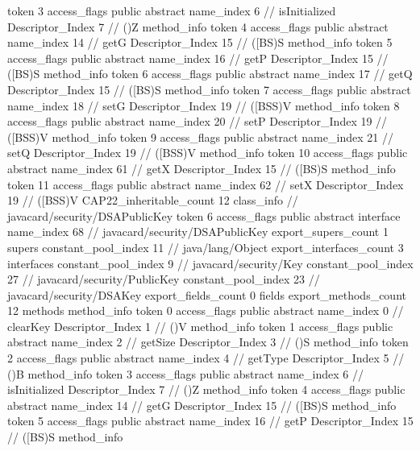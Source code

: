 {{{{{					token	3
					access_flags	public abstract
					name_index	6		// isInitialized
					Descriptor_Index	7		// ()Z
				}
				method_info {
					token	4
					access_flags	public abstract
					name_index	14		// getG
					Descriptor_Index	15		// ([BS)S
				}
				method_info {
					token	5
					access_flags	public abstract
					name_index	16		// getP
					Descriptor_Index	15		// ([BS)S
				}
				method_info {
					token	6
					access_flags	public abstract
					name_index	17		// getQ
					Descriptor_Index	15		// ([BS)S
				}
				method_info {
					token	7
					access_flags	public abstract
					name_index	18		// setG
					Descriptor_Index	19		// ([BSS)V
				}
				method_info {
					token	8
					access_flags	public abstract
					name_index	20		// setP
					Descriptor_Index	19		// ([BSS)V
				}
				method_info {
					token	9
					access_flags	public abstract
					name_index	21		// setQ
					Descriptor_Index	19		// ([BSS)V
				}
				method_info {
					token	10
					access_flags	public abstract
					name_index	61		// getX
					Descriptor_Index	15		// ([BS)S
				}
				method_info {
					token	11
					access_flags	public abstract
					name_index	62		// setX
					Descriptor_Index	19		// ([BSS)V
				}
			}
			CAP22_inheritable_count	12
		}
		class_info {		// javacard/security/DSAPublicKey
			token	6
			access_flags	public abstract interface
			name_index	68		// javacard/security/DSAPublicKey
			export_supers_count	1
			supers {
				constant_pool_index	11		// java/lang/Object
			}
			export_interfaces_count	3
			interfaces {
				constant_pool_index	9		// javacard/security/Key
				constant_pool_index	27		// javacard/security/PublicKey
				constant_pool_index	23		// javacard/security/DSAKey
			}
			export_fields_count	0
			fields {
			}
			export_methods_count	12
			methods {
				method_info {
					token	0
					access_flags	public abstract
					name_index	0		// clearKey
					Descriptor_Index	1		// ()V
				}
				method_info {
					token	1
					access_flags	public abstract
					name_index	2		// getSize
					Descriptor_Index	3		// ()S
				}
				method_info {
					token	2
					access_flags	public abstract
					name_index	4		// getType
					Descriptor_Index	5		// ()B
				}
				method_info {
					token	3
					access_flags	public abstract
					name_index	6		// isInitialized
					Descriptor_Index	7		// ()Z
				}
				method_info {
					token	4
					access_flags	public abstract
					name_index	14		// getG
					Descriptor_Index	15		// ([BS)S
				}
				method_info {
					token	5
					access_flags	public abstract
					name_index	16		// getP
					Descriptor_Index	15		// ([BS)S
				}
				method_info {
}}}}}
